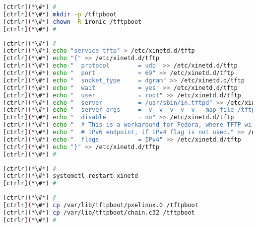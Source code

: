 \begin{lstlisting}[language=bash,keywords={}]
[ctrlr](*\#*) #
[ctrlr](*\#*) mkdir -p /tftpboot
[ctrlr](*\#*) chown -R ironic /tftpboot
[ctrlr](*\#*) #
\end{lstlisting}
\begin{lstlisting}[language=bash,keywords={}]
[ctrlr](*\#*) #
[ctrlr](*\#*) echo "service tftp" > /etc/xinetd.d/tftp
[ctrlr](*\#*) echo "{" >> /etc/xinetd.d/tftp
[ctrlr](*\#*) echo "  protocol        = udp" >> /etc/xinetd.d/tftp
[ctrlr](*\#*) echo "  port            = 69" >> /etc/xinetd.d/tftp
[ctrlr](*\#*) echo "  socket_type     = dgram" >> /etc/xinetd.d/tftp
[ctrlr](*\#*) echo "  wait            = yes" >> /etc/xinetd.d/tftp
[ctrlr](*\#*) echo "  user            = root" >> /etc/xinetd.d/tftp
[ctrlr](*\#*) echo "  server          = /usr/sbin/in.tftpd" >> /etc/xinetd.d/tftp
[ctrlr](*\#*) echo "  server_args     = -v -v -v -v -v --map-file /tftpboot/map-file /tftpboot" >> /etc/xinetd.d/tftp
[ctrlr](*\#*) echo "  disable         = no" >> /etc/xinetd.d/tftp
[ctrlr](*\#*) echo "  # This is a workaround for Fedora, where TFTP will listen only on" >> /etc/xinetd.d/tftp
[ctrlr](*\#*) echo "  # IPv6 endpoint, if IPv4 flag is not used." >> /etc/xinetd.d/tftp
[ctrlr](*\#*) echo "  flags           = IPv4" >> /etc/xinetd.d/tftp
[ctrlr](*\#*) echo "}" >> /etc/xinetd.d/tftp
[ctrlr](*\#*) #
\end{lstlisting}
\begin{lstlisting}[language=bash,keywords={}]
[ctrlr](*\#*) #
[ctrlr](*\#*) systemctl restart xinetd
[ctrlr](*\#*) #
\end{lstlisting}
\begin{lstlisting}[language=bash,keywords={}]
[ctrlr](*\#*) #
[ctrlr](*\#*) cp /var/lib/tftpboot/pxelinux.0 /tftpboot
[ctrlr](*\#*) cp /var/lib/tftpboot/chain.c32 /tftpboot
[ctrlr](*\#*) #
\end{lstlisting}
